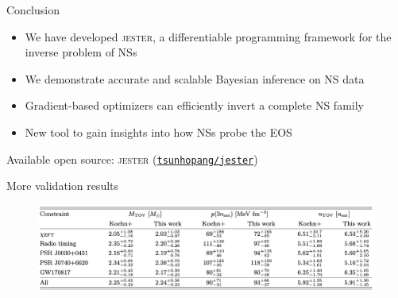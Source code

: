 \documentclass[usenames,dvipsnames,t]{beamer}
\begin{document}
\begin{frame}{Conclusion}

  \def\x{5mm}
  \def\y{7mm}

  \begin{itemize}
    \item We have developed \textsc{jester}, a differentiable programming framework for the inverse problem of NSs

    \vspace{\x}

    \item We demonstrate accurate and scalable Bayesian inference on NS data

    \vspace{\x}

    \item Gradient-based optimizers can efficiently invert a complete NS family

    \vspace{\x}

    \item New tool to gain insights into how NSs probe the EOS
  \end{itemize}

  \vspace{\y}

  Available open source: \textsc{jester} (\href{https://github.com/tsunhopang/jester}{{\faGithub \texttt{tsunhopang/jester}}})
\end{frame}

\appendix

\begin{frame}{More validation results}


  \begin{figure}
    \centering
    \includegraphics[width=\linewidth]{Figures/Untitled.jpg}
  \end{figure}
\end{frame}
\end{document}
